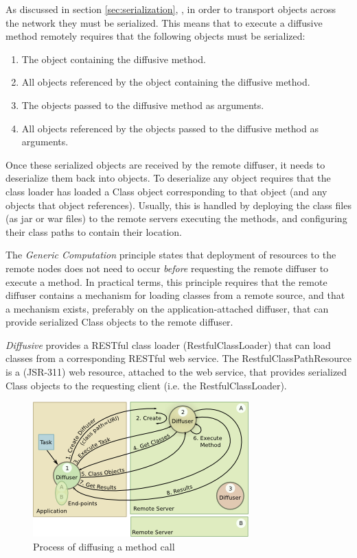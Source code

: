 \documentclass[11pt]{scrartcl}
\begin{document}
As discussed in section \ref{sec:serialization}, , in order to transport objects across the network they must be serialized. This means that to execute a diffusive method remotely requires that the following objects must be serialized:
\begin{enumerate}
\item The object containing the diffusive method.
\item All objects referenced by the object containing the diffusive method.
\item The objects passed to the diffusive method as arguments.
\item All objects referenced by the objects passed to the diffusive method as arguments.
\end{enumerate}
Once these serialized objects are received by the remote diffuser, it needs to deserialize them back into objects. To deserialize any object requires that the class loader has loaded a \textsf{Class} object corresponding to that object (and any objects that object references). Usually, this is handled by deploying the class files (as jar or war files) to the remote servers executing the methods, and configuring their class paths to contain their location.

The \emph{Generic Computation} principle states that deployment of resources to the remote nodes does not need to occur \emph{before} requesting the remote diffuser to execute a method. In practical terms, this principle requires that the remote diffuser contains a mechanism for loading classes from a remote source, and that a mechanism exists, preferably on the application-attached diffuser, that can provide serialized \textsf{Class} objects to the remote diffuser. 

\emph{Diffusive} provides a RESTful class loader (\textsf{RestfulClassLoader}) that can load classes from a corresponding RESTful web service. The \textsf{RestfulClassPathResource} is a (JSR-311) web resource, attached to the web service, that provides serialized \textsf{Class} objects to the requesting client (i.e. the \textsf{RestfulClassLoader}). 

\begin{figure}[htbp]
\begin{center}
\includegraphics[scale=1.1]{diffusing}
\caption{Process of diffusing a method call}
\label{fig:diffusing}
\end{center}
\end{figure}
\end{document}
